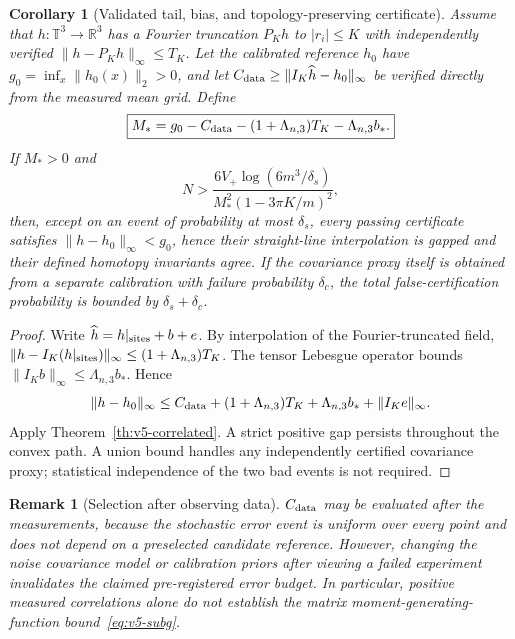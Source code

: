\documentclass[aps,prd,onecolumn,notitlepage,11pt,superscriptaddress,longbibliography]{revtex4-2}
\newtheorem{corollary}{Corollary}
\newtheorem{remark}{Remark}
\begin{document}
\begin{corollary}[Validated tail, bias, and topology-preserving certificate]\label{co:v5-topology}
Assume that $h:\mathbb T^3\to\mathbb R^3$ has a Fourier truncation $P_Kh$ to $|r_i|\le K$ with independently verified $\|h-P_Kh\|_\infty\le T_K$. Let the calibrated reference $h_0$ have $g_0=\inf_x\|h_0(x)\|_2>0$, and let $C_{\rm data}\ge\|I_K\widehat h-h_0\|_\infty$ be verified directly from the measured mean grid. Define
\begin{equation}\label{eq:v5-margin}
\boxed{M_*=g_0-C_{\rm data}-(1+\Lambda_{n,3})T_K-\Lambda_{n,3}b_*.}
\end{equation}
If $M_*>0$ and
\begin{equation}\label{eq:v5-budget}
\boxed{N>\frac{6V_+\log(6m^3/\delta_s)}{M_*^2(1-3\pi K/m)^2},}
\end{equation}
then, except on an event of probability at most $\delta_s$, every \emph{passing} certificate satisfies $\|h-h_0\|_\infty<g_0$, hence their straight-line interpolation is gapped and their defined homotopy invariants agree. If the covariance proxy itself is obtained from a separate calibration with failure probability $\delta_c$, the total false-certification probability is bounded by $\delta_s+\delta_c$.
\end{corollary}
\begin{proof}
Write $\widehat h=h|_{\rm sites}+b+e$. By interpolation of the Fourier-truncated field,
$\|h-I_K(h|_{\rm sites})\|_\infty\le(1+\Lambda_{n,3})T_K$.
The tensor Lebesgue operator bounds $\|I_Kb\|_\infty\le\Lambda_{n,3}b_*$. Hence
\[
\|h-h_0\|_\infty\le C_{\rm data}+(1+\Lambda_{n,3})T_K+\Lambda_{n,3}b_*+\|I_Ke\|_\infty.
\]
Apply Theorem~\ref{th:v5-correlated}. A strict positive gap persists throughout the convex path. A union bound handles any independently certified covariance proxy; statistical independence of the two bad events is not required.
\end{proof}

\begin{remark}[Selection after observing data]
$C_{\rm data}$ may be evaluated \emph{after} the measurements, because the stochastic error event is uniform over every point and does not depend on a preselected candidate reference. However, changing the noise covariance model or calibration priors after viewing a failed experiment invalidates the claimed pre-registered error budget. In particular, positive measured correlations alone do not establish the matrix moment-generating-function bound~\eqref{eq:v5-subg}.
\end{remark}
\end{document}
